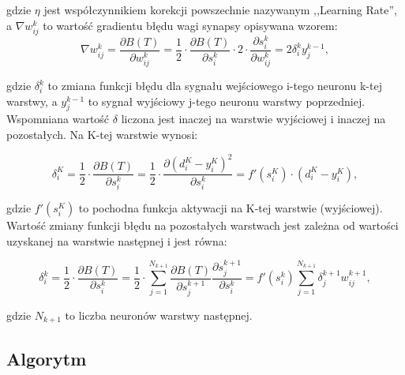 \documentclass[12pt,a4paper]{article}
\begin{document}
    \noindent gdzie $\eta$ jest współczynnikiem korekcji powszechnie nazywanym ,,Learning Rate'', a $\nabla w^k_{ij}$ to wartość gradientu błędu wagi synapsy opisywana wzorem:
    \begin{equation*}
        \nabla w^k_{ij} = \frac{\partial B(T)}{\partial w^k_{ij}} = \frac{1}{2} \cdot \frac{\partial B(T)}{\partial s^k_i} \cdot 2 \cdot \frac{\partial s^k_i}{\partial w^k_{ij}} = 2 \delta^k_i y^{k-1}_j,
    \end{equation*}
    
    \noindent gdzie $\delta^k_i$ to zmiana funkcji błędu dla sygnału wejściowego i-tego neuronu k-tej warstwy, a $y^{k-1}_j$ to sygnał wyjściowy j-tego neuronu warstwy poprzedniej. Wspomniana wartość $\delta$ liczona jest inaczej na warstwie wyjściowej i inaczej na pozostałych. Na K-tej warstwie wynosi:
    
    \begin{equation*}
        \delta^K_i = \frac{1}{2} \cdot \frac{\partial B(T)}{\partial s^k_i} = \frac{1}{2} \cdot \frac{\partial (d^K_{i} - y^K_{i})^2}{\partial s^k_i} = f'(s^K_i) \cdot (d^K_{i} - y^K_{i}),
    \end{equation*}
    
    \noindent gdzie $f'(s^K_i)$ to pochodna funkcja aktywacji na K-tej warstwie (wyjściowej). Wartość zmiany funkcji błędu na pozostałych warstwach jest zależna od wartości uzyskanej na warstwie następnej i jest równa:
    
    \begin{equation*}
        \delta^k_i = \frac{1}{2} \cdot \frac{\partial B(T)}{\partial s^k_i} = \frac{1}{2} \cdot \sum_{j=1}^{N_{k+1}} \frac{\partial B(T)}{\partial s_j^{k+1}} \frac{\partial s_j^{k+1}}{\partial s^k_i} = f'(s^k_i) \sum_{j=1}^{N_{k+1}} \delta^{k+1}_j w^{k+1}_{ij},
    \end{equation*}
    
    \noindent gdzie $N_{k+1}$ to liczba neuronów warstwy następnej.
	
\newpage
	\subsection*{Algorytm}
	
\end{document}
